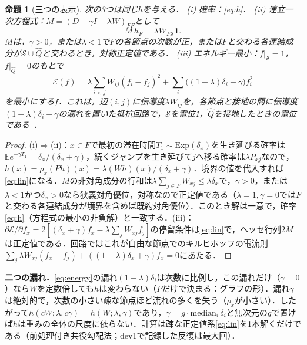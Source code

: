 \documentclass[a4paper,10pt,dvipdfmx]{jsarticle}
\newtheorem{proposition}{命題}
\theoremstyle{definition}
\newcommand{\cS}{\mathcal{S}}
\newcommand{\hQ}{\hat{Q}}
\newcommand{\E}{\mathbb{E}}
\begin{document}
\begin{proposition}[三つの表示]
次の3つは同じ$h$を与える．
(i) 確率：\eqref{eq:h}．
(ii) 連立一次方程式：$M=(D+\gamma I-\lambda W)_{FF}$として
\begin{equation}
M\,h_F=\lambda W_{F\cS}\mathbf{1}.
\label{eq:lin}
\end{equation}
$M$は，$\gamma>0$，または$\lambda<1$で$F$の各節点の次数が正，または$F$と交わる各連結成分が$\cS\cup\hQ$と交わるとき，対称正定値である．
(iii) エネルギー最小：$f|_{\cS}=1$，$f|_{\hQ}=0$のもとで
\begin{equation}
\mathcal{E}(f)=\lambda\sum_{i<j}W_{ij}(f_i-f_j)^2+\sum_i\big((1-\lambda)\delta_i+\gamma\big)f_i^2
\label{eq:energy}
\end{equation}
を最小にする$f$．これは，辺$(i,j)$に伝導度$\lambda W_{ij}$を，各節点と接地の間に伝導度$(1-\lambda)\delta_i+\gamma$の漏れを置いた抵抗回路で，$\cS$を電位1，$\hQ$を接地したときの電位である~\cite{doyle1984}．
\end{proposition}
\begin{proof}
(i)$\Rightarrow$(ii)：$x\in F$で最初の滞在時間$T_1\sim\mathrm{Exp}(\delta_x)$を生き延びる確率は$\E e^{-\gamma T_1}=\delta_x/(\delta_x+\gamma)$，続くジャンプを生き延びて$j$へ移る確率は$\lambda P_{xj}$なので，$h(x)=\rho_x(Ph)(x)=\lambda(Wh)(x)/(\delta_x+\gamma)$．境界の値を代入すれば\eqref{eq:lin}になる．$M$の非対角成分の行和は$\lambda\sum_{j\in F}W_{xj}\le\lambda\delta_x$で，$\gamma>0$，または$\lambda<1$かつ$\delta_x>0$なら狭義対角優位，対称なので正定値である（$\lambda{=}1,\gamma{=}0$では$F$と交わる各連結成分が境界を含めば既約対角優位）．このとき解は一意で，確率\eqref{eq:h}（方程式の最小の非負解）と一致する．(iii)：$\partial\mathcal{E}/\partial f_x=2[(\delta_x+\gamma)f_x-\lambda\sum_jW_{xj}f_j]$の停留条件は\eqref{eq:lin}で，ヘッセ行列$2M$は正定値である．回路ではこれが自由な節点でのキルヒホッフの電流則$\sum_j\lambda W_{xj}(f_x-f_j)+((1-\lambda)\delta_x+\gamma)f_x=0$にあたる．
\end{proof}

\textbf{二つの漏れ．}\eqref{eq:energy}の漏れ$(1-\lambda)\delta_i$は次数に比例し，この漏れだけ（$\gamma{=}0$）なら$W$を定数倍しても$h$は変わらない（$P$だけで決まる：グラフの形）．漏れ$\gamma$は絶対的で，次数の小さい疎な節点ほど流れの多くを失う（$\rho_x$が小さい）．したがって$h(cW;\lambda,c\gamma)=h(W;\lambda,\gamma)$であり，$\gamma=g\cdot\mathrm{median}_i\,\delta_i$と無次元の$g$で置けば$h$は重みの全体の尺度に依らない．計算は疎な正定値系\eqref{eq:lin}を1本解くだけである（前処理付き共役勾配法；dev1で記録した反復は最大\NItMax{}回）．
\end{document}
